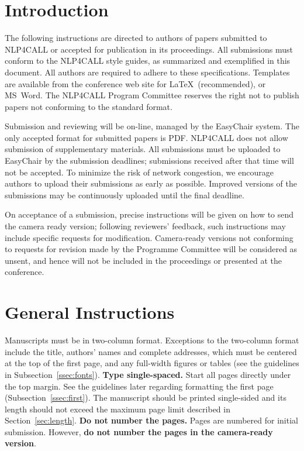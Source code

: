 \documentclass[11pt]{article}
\begin{document}
\section{Introduction}

The following instructions are directed to authors of papers submitted
to NLP4CALL or accepted for publication in its proceedings. 
All submissions must conform to the NLP4CALL style guides, as summarized
and exemplified in this document. All authors are required to adhere to these specifications. 
Templates are available from the conference web site for \LaTeX\
(recommended), or MS~Word. The NLP4CALL Program Committee reserves
the right not to publish papers not conforming to the standard format. 

Submission and reviewing will be on-line, managed by the EasyChair system.
The only accepted format for submitted papers is PDF.
NLP4CALL does not allow submission of supplementary materials.
All submissions must be uploaded to EasyChair by the submission deadlines;
submissions received after that time will not be accepted.
To minimize the risk of network congestion, we encourage authors to upload
their submissions as early as possible. 
Improved versions of the submissions may be continuously uploaded until the
final deadline. 

On acceptance of a submission, precise instructions will be given on how to
send the camera ready version; following reviewers' feedback, such instructions
may include specific requests for modification.
Camera-ready versions not conforming to requests for revision made by the
Programme Committee will be considered as unsent, and hence will not be
included in the proceedings or presented at the conference.

\section{General Instructions}

Manuscripts must be in two-column format.  Exceptions to the
two-column format include the title, authors' names and complete
addresses, which must be centered at the top of the first page, and
any full-width figures or tables (see the guidelines in
Subsection~\ref{ssec:fonts}). {\bf Type single-spaced.}  Start all
pages directly under the top margin. See the guidelines later
regarding formatting the first page (Subsection~\ref{ssec:first}).
The manuscript should be printed single-sided and its length should
not exceed the maximum page limit described in
Section~\ref{sec:length}.  {\bf Do not number the pages.}
Pages are numbered for  initial submission. However, {\bf do not number the pages in the camera-ready version}.
\end{document}
